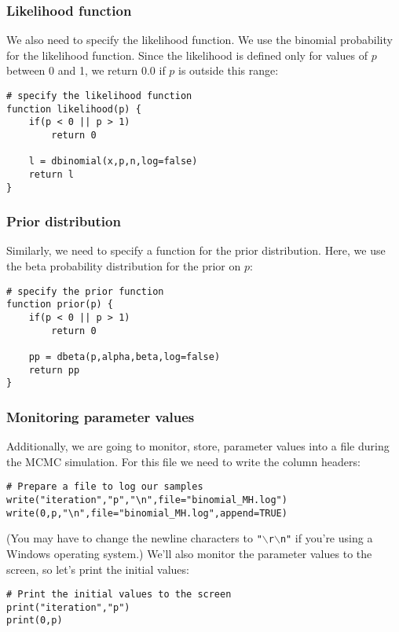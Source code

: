 \subsubsection{Likelihood function}
We also need to specify the likelihood function.
We use the binomial probability for the likelihood function. Since the likelihood is defined only for values of $p$ between 0 and 1, we return 0.0 if $p$ is outside this range:
{\tt \begin{snugshade*}
\begin{lstlisting}
# specify the likelihood function
function likelihood(p) {
    if(p < 0 || p > 1)
        return 0

    l = dbinomial(x,p,n,log=false)
    return l
}
\end{lstlisting}
\end{snugshade*}}

\subsubsection{Prior distribution}
Similarly, we need to specify a function for the prior distribution.
Here, we use the beta probability distribution for the prior on $p$:
{\tt \begin{snugshade*}
\begin{lstlisting}    
# specify the prior function
function prior(p) {
    if(p < 0 || p > 1)
        return 0
        
    pp = dbeta(p,alpha,beta,log=false)
    return pp
}
\end{lstlisting}
\end{snugshade*}}


\subsubsection{Monitoring parameter values}
Additionally, we are going to monitor, \IE store, parameter values into a file during the MCMC simulation.
For this file we need to write the column headers:
{\tt \begin{snugshade*}
\begin{lstlisting}
# Prepare a file to log our samples
write("iteration","p","\n",file="binomial_MH.log")
write(0,p,"\n",file="binomial_MH.log",append=TRUE)
\end{lstlisting}
\end{snugshade*}}
(You may have to change the newline characters to \texttt{"$\backslash$r$\backslash$n"} if you're using a Windows operating system.)
We'll also monitor the parameter values to the screen, so let's print the initial values:
{\tt \begin{snugshade*}
\begin{lstlisting}
# Print the initial values to the screen
print("iteration","p")
print(0,p)
\end{lstlisting}
\end{snugshade*}}

